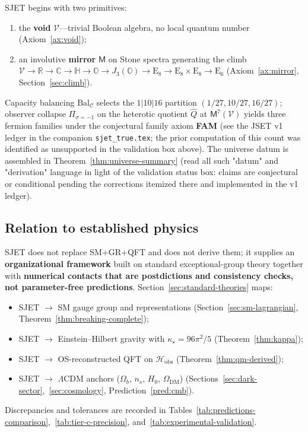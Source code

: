 \documentclass[aps,prd,onecolumn,amsmath,amssymb,nofootinbib,11pt]{revtex4-2}
\numberwithin{equation}{section}
\theoremstyle{plain}
\theoremstyle{definition}
\theoremstyle{remark}
\newcommand{\R}{\mathbb{R}}
\newcommand{\C}{\mathbb{C}}
\newcommand{\Quat}{\mathbb{H}}
\newcommand{\Oct}{\mathbb{O}}
\newcommand{\jalg}{J_3(\mathbb{O})}
\newcommand{\E}[1]{\mathrm{E}_{#1}}
\newcommand{\Void}{\mathcal{V}}
\newcommand{\Mirror}{\mathsf{M}}
\begin{document}
SJET begins with two primitives:
\begin{enumerate}[label=(\roman*),leftmargin=*]
  \item the \textbf{void} $\Void$---trivial Boolean algebra, no local quantum
    number (Axiom~\ref{ax:void});
  \item an involutive \textbf{mirror} $\Mirror$ on Stone spectra generating the
    climb $\Void\to\R\to\C\to\Quat\to\Oct\to\jalg\to\E{8}\to\E{8}\times\E{8}\to\E{6}$
    (Axiom~\ref{ax:mirror}, Section~\ref{sec:climb}).
\end{enumerate}
Capacity balancing $\mathrm{Bal}_{\mathcal{C}}$ selects the $1|10|16$ partition
$(1/27,10/27,16/27)$; observer collapse $\Pi_{\sigma=-1}$ on the heterotic
quotient $\hat Q$ at $\Mirror^7(\Void)$ yields three fermion families
under the conjectural family axiom \textbf{FAM} (see the JSET v1 ledger in the companion \texttt{sjet_true.tex}; the prior computation of this count was identified as unsupported in the validation box above). The universe datum is assembled in
Theorem~\ref{thm:universe-summary} (read all such "datum" and "derivation" language in light of the validation status box: claims are conjectural or conditional pending the corrections itemized there and implemented in the v1 ledger).

\subsection{Relation to established physics}

SJET does not replace SM+GR+QFT and does not derive them; it supplies an
\textbf{organizational framework} built on standard exceptional-group theory together with
\textbf{numerical contacts that are postdictions and consistency checks, not parameter-free predictions}. Section~\ref{sec:standard-theories} maps:
\begin{itemize}[leftmargin=*]
  \item SJET $\to$ SM gauge group and representations
    (Section~\ref{sec:sm-lagrangian}, Theorem~\ref{thm:breaking-complete});
  \item SJET $\to$ Einstein--Hilbert gravity with $\kappa_\star=96\pi^2/5$
    (Theorem~\ref{thm:kappa});
  \item SJET $\to$ OS-reconstructed QFT on $\mathcal{H}_{\mathrm{obs}}$
    (Theorem~\ref{thm:qm-derived});
  \item SJET $\to$ $\Lambda$CDM anchors ($\Omega_b$, $n_s$, $H_0$, $\Omega_{\mathrm{DM}}$)
    (Sections~\ref{sec:dark-sector},~\ref{sec:cosmology},
    Prediction~\ref{pred:cmb}).
\end{itemize}
Discrepancies and tolerances are recorded in
Tables~\ref{tab:predictions-comparison},~\ref{tab:tier-c-precision},
and~\ref{tab:experimental-validation}.
\end{document}
